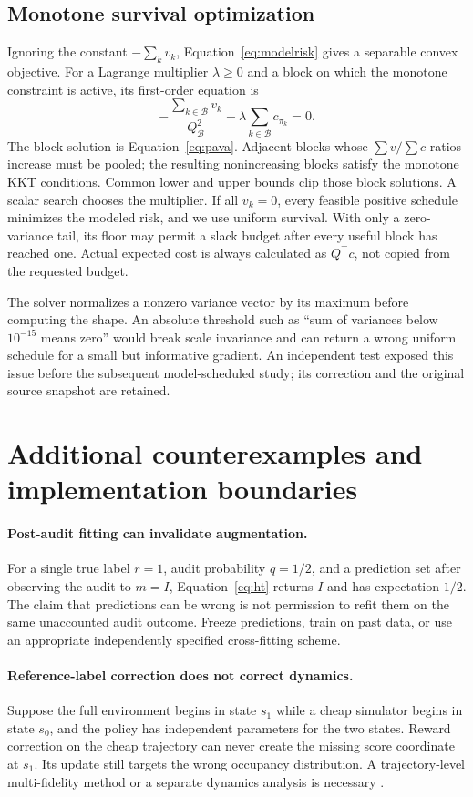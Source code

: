 \subsection{Monotone survival optimization}
Ignoring the constant $-\sum_kv_k$, Equation~\eqref{eq:modelrisk} gives a separable convex objective. For a Lagrange multiplier $\lambda\ge0$ and a block on which the monotone constraint is active, its first-order equation is
\[
 -\frac{\sum_{k\in\mathcal B}v_k}{Q_{\mathcal B}^2}
 +\lambda\sum_{k\in\mathcal B}c_{\pi_k}=0.
\]
The block solution is Equation~\eqref{eq:pava}. Adjacent blocks whose $\sum v/\sum c$ ratios increase must be pooled; the resulting nonincreasing blocks satisfy the monotone KKT conditions. Common lower and upper bounds clip those block solutions. A scalar search chooses the multiplier. If all $v_k=0$, every feasible positive schedule minimizes the modeled risk, and we use uniform survival. With only a zero-variance tail, its floor may permit a slack budget after every useful block has reached one. Actual expected cost is always calculated as $Q^\top c$, not copied from the requested budget.

The solver normalizes a nonzero variance vector by its maximum before computing the shape. An absolute threshold such as ``sum of variances below $10^{-15}$ means zero'' would break scale invariance and can return a wrong uniform schedule for a small but informative gradient. An independent test exposed this issue before the subsequent model-scheduled study; its correction and the original source snapshot are retained.

\section{Additional counterexamples and implementation boundaries}
\paragraph{Post-audit fitting can invalidate augmentation.}
For a single true label $r=1$, audit probability $q=1/2$, and a prediction set after observing the audit to $m=I$, Equation~\eqref{eq:ht} returns $I$ and has expectation $1/2$. The claim that predictions can be wrong is not permission to refit them on the same unaccounted audit outcome. Freeze predictions, train on past data, or use an appropriate independently specified cross-fitting scheme.

\paragraph{Reference-label correction does not correct dynamics.}
Suppose the full environment begins in state $s_1$ while a cheap simulator begins in state $s_0$, and the policy has independent parameters for the two states. Reward correction on the cheap trajectory can never create the missing score coordinate at $s_1$. Its update still targets the wrong occupancy distribution. A trajectory-level multi-fidelity method or a separate dynamics analysis is necessary \citep{liu2026}.

